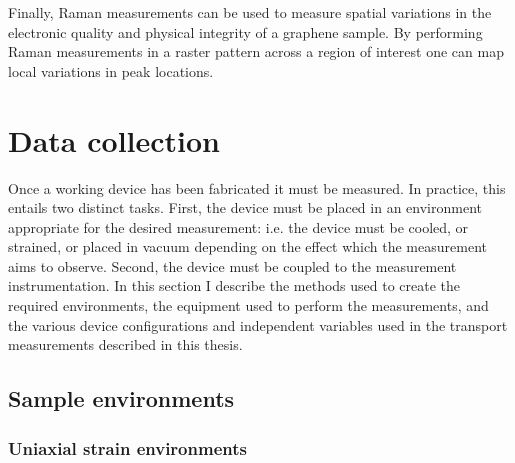 \documentclass[edeposit,fullpage,draftthesis]{uiucthesis2009}
\begin{document}
        Finally, Raman measurements can be used to measure spatial variations in the electronic quality
        and physical integrity of a graphene sample. By performing Raman measurements in a raster pattern
        across a region of interest one can map local variations in peak locations.
        
    
    \section{Data collection}
    
    Once a working device has been fabricated it must be measured. In practice, this entails two distinct
    tasks. First, the device must be placed in an environment appropriate for the desired measurement:
    i.e. the device must be cooled, or strained, or placed in vacuum depending on the effect
    which the measurement aims to observe. Second, the device must be coupled to the measurement instrumentation.
    In this section I describe the methods used to create the required environments, the equipment used to
    perform the measurements, and the various device configurations and independent variables used in the
    transport measurements described in this thesis.
    
        \subsection{Sample environments}
        
        \subsubsection*{Uniaxial strain environments}
        
\end{document}
